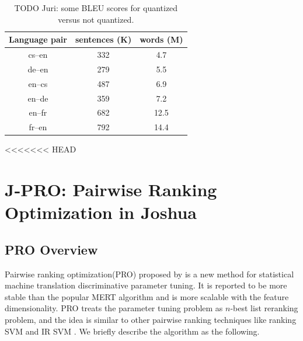 \documentclass[11pt]{article}
\begin{document}
\begin{table}
\centering
\begin{tabular}{|c|c|c|}
Language pair & sentences (K) & words (M) \\
\hline\hline
cs--en & 332 & 4.7 \\
de--en & 279 & 5.5 \\
en--cs & 487 & 6.9 \\
en--de & 359 & 7.2 \\
en--fr & 682 & 12.5 \\
fr--en & 792 & 14.4 \\
\end{tabular}
\caption{TODO Juri: some BLEU scores for quantized versus not quantized.}
\end{table}


<<<<<<< HEAD
\section{J-PRO: Pairwise Ranking Optimization in Joshua}
\label{section:results}
\subsection{PRO Overview} \label{section:pro-overview}
Pairwise ranking optimization(PRO) proposed by \cite{Hopkins2011} is a new method for statistical machine translation discriminative parameter tuning. It is reported to be more stable than the popular MERT algorithm\cite{Och2003} and is more scalable with the feature dimensionality. PRO treats the parameter tuning problem as $n$-best list reranking problem, and the idea is similar to other pairwise ranking techniques like ranking SVM and IR SVM \cite{Hang2011}. We briefly describe the algorithm as the following.
\end{document}
